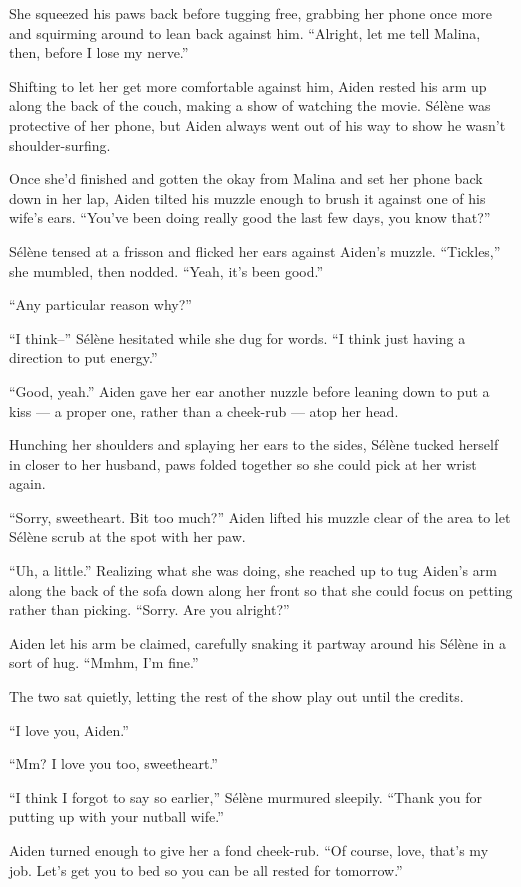 She squeezed his paws back before tugging free, grabbing her phone once more and squirming around to lean back against him. ``Alright, let me tell Malina, then, before I lose my nerve.''

Shifting to let her get more comfortable against him, Aiden rested his arm up along the back of the couch, making a show of watching the movie. Sélène was protective of her phone, but Aiden always went out of his way to show he wasn't shoulder-surfing.

Once she'd finished and gotten the okay from Malina and set her phone back down in her lap, Aiden tilted his muzzle enough to brush it against one of his wife's ears. ``You've been doing really good the last few days, you know that?''

Sélène tensed at a frisson and flicked her ears against Aiden's muzzle. ``Tickles,'' she mumbled, then nodded. ``Yeah, it's been good.''

``Any particular reason why?''

``I think--'' Sélène hesitated while she dug for words. ``I think just having a direction to put energy.''

``Good, yeah.'' Aiden gave her ear another nuzzle before leaning down to put a kiss --- a proper one, rather than a cheek-rub --- atop her head.

Hunching her shoulders and splaying her ears to the sides, Sélène tucked herself in closer to her husband, paws folded together so she could pick at her wrist again.

``Sorry, sweetheart. Bit too much?'' Aiden lifted his muzzle clear of the area to let Sélène scrub at the spot with her paw.

``Uh, a little.'' Realizing what she was doing, she reached up to tug Aiden's arm along the back of the sofa down along her front so that she could focus on petting rather than picking. ``Sorry. Are you alright?''

Aiden let his arm be claimed, carefully snaking it partway around his Sélène in a sort of hug. ``Mmhm, I'm fine.''

The two sat quietly, letting the rest of the show play out until the credits.

``I love you, Aiden.''

``Mm? I love you too, sweetheart.''

``I think I forgot to say so earlier,'' Sélène murmured sleepily. ``Thank you for putting up with your nutball wife.''

Aiden turned enough to give her a fond cheek-rub. ``Of course, love, that's my job. Let's get you to bed so you can be all rested for tomorrow.''

